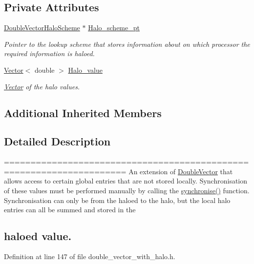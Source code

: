 \subsection*{Private Attributes}
\begin{DoxyCompactItemize}
\item 
\hyperlink{classoomph_1_1DoubleVectorHaloScheme}{Double\+Vector\+Halo\+Scheme} $\ast$ \hyperlink{classoomph_1_1DoubleVectorWithHaloEntries_a59c62401e999f683365a34151362e328}{Halo\+\_\+scheme\+\_\+pt}
\begin{DoxyCompactList}\small\item\em Pointer to the lookup scheme that stores information about on which processor the required information is haloed. \end{DoxyCompactList}\item 
\hyperlink{classoomph_1_1Vector}{Vector}$<$ double $>$ \hyperlink{classoomph_1_1DoubleVectorWithHaloEntries_ac2b04ca1db09db85401e0d59a225856b}{Halo\+\_\+value}
\begin{DoxyCompactList}\small\item\em \hyperlink{classoomph_1_1Vector}{Vector} of the halo values. \end{DoxyCompactList}\end{DoxyCompactItemize}
\subsection*{Additional Inherited Members}


\subsection{Detailed Description}
===================================================================== An extension of \hyperlink{classoomph_1_1DoubleVector}{Double\+Vector} that allows access to certain global entries that are not stored locally. Synchronisation of these values must be performed manually by calling the \hyperlink{classoomph_1_1DoubleVectorWithHaloEntries_a6d5b6e2c1c80d4fb468c851030d62492}{synchronise()} function. Synchronisation can only be from the haloed to the halo, but the local halo entries can all be summed and stored in the \subsection*{haloed value. }

Definition at line 147 of file double\+\_\+vector\+\_\+with\+\_\+halo.\+h.



